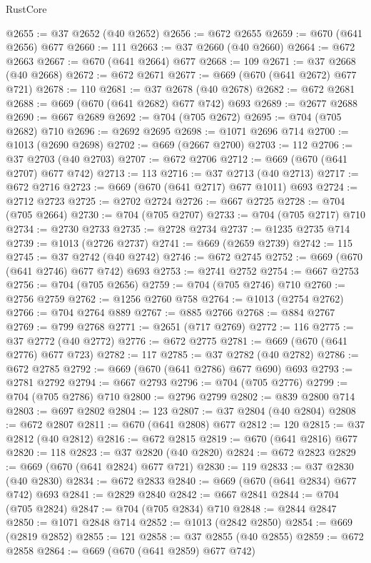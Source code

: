 \begin{lexlean}{RustCore}
\begin{coremodule}
@2655 := @37 @2652 (@40 @2652)
@2656 := @672 @2655
@2659 := @670 (@641 @2656) @677
@2660 := 111
@2663 := @37 @2660 (@40 @2660)
@2664 := @672 @2663
@2667 := @670 (@641 @2664) @677
@2668 := 109
@2671 := @37 @2668 (@40 @2668)
@2672 := @672 @2671
@2677 := @669 (@670 (@641 @2672) @677 @721)
@2678 := 110
@2681 := @37 @2678 (@40 @2678)
@2682 := @672 @2681
@2688 := @669 (@670 (@641 @2682) @677 @742) @693
@2689 := @2677 @2688
@2690 := @667 @2689
@2692 := @704 (@705 @2672)
@2695 := @704 (@705 @2682) @710
@2696 := @2692 @2695
@2698 := @1071 @2696 @714
@2700 := @1013 (@2690 @2698)
@2702 := @669 (@2667 @2700)
@2703 := 112
@2706 := @37 @2703 (@40 @2703)
@2707 := @672 @2706
@2712 := @669 (@670 (@641 @2707) @677 @742)
@2713 := 113
@2716 := @37 @2713 (@40 @2713)
@2717 := @672 @2716
@2723 := @669 (@670 (@641 @2717) @677 @1011) @693
@2724 := @2712 @2723
@2725 := @2702 @2724
@2726 := @667 @2725
@2728 := @704 (@705 @2664)
@2730 := @704 (@705 @2707)
@2733 := @704 (@705 @2717) @710
@2734 := @2730 @2733
@2735 := @2728 @2734
@2737 := @1235 @2735 @714
@2739 := @1013 (@2726 @2737)
@2741 := @669 (@2659 @2739)
@2742 := 115
@2745 := @37 @2742 (@40 @2742)
@2746 := @672 @2745
@2752 := @669 (@670 (@641 @2746) @677 @742) @693
@2753 := @2741 @2752
@2754 := @667 @2753
@2756 := @704 (@705 @2656)
@2759 := @704 (@705 @2746) @710
@2760 := @2756 @2759
@2762 := @1256 @2760 @758
@2764 := @1013 (@2754 @2762)
@2766 := @704 @2764 @889
@2767 := @885 @2766
@2768 := @884 @2767
@2769 := @799 @2768
@2771 := @2651 (@717 @2769)
@2772 := 116
@2775 := @37 @2772 (@40 @2772)
@2776 := @672 @2775
@2781 := @669 (@670 (@641 @2776) @677 @723)
@2782 := 117
@2785 := @37 @2782 (@40 @2782)
@2786 := @672 @2785
@2792 := @669 (@670 (@641 @2786) @677 @690) @693
@2793 := @2781 @2792
@2794 := @667 @2793
@2796 := @704 (@705 @2776)
@2799 := @704 (@705 @2786) @710
@2800 := @2796 @2799
@2802 := @839 @2800 @714
@2803 := @697 @2802
@2804 := 123
@2807 := @37 @2804 (@40 @2804)
@2808 := @672 @2807
@2811 := @670 (@641 @2808) @677
@2812 := 120
@2815 := @37 @2812 (@40 @2812)
@2816 := @672 @2815
@2819 := @670 (@641 @2816) @677
@2820 := 118
@2823 := @37 @2820 (@40 @2820)
@2824 := @672 @2823
@2829 := @669 (@670 (@641 @2824) @677 @721)
@2830 := 119
@2833 := @37 @2830 (@40 @2830)
@2834 := @672 @2833
@2840 := @669 (@670 (@641 @2834) @677 @742) @693
@2841 := @2829 @2840
@2842 := @667 @2841
@2844 := @704 (@705 @2824)
@2847 := @704 (@705 @2834) @710
@2848 := @2844 @2847
@2850 := @1071 @2848 @714
@2852 := @1013 (@2842 @2850)
@2854 := @669 (@2819 @2852)
@2855 := 121
@2858 := @37 @2855 (@40 @2855)
@2859 := @672 @2858
@2864 := @669 (@670 (@641 @2859) @677 @742)

\end{coremodule}
\end{lexlean}
